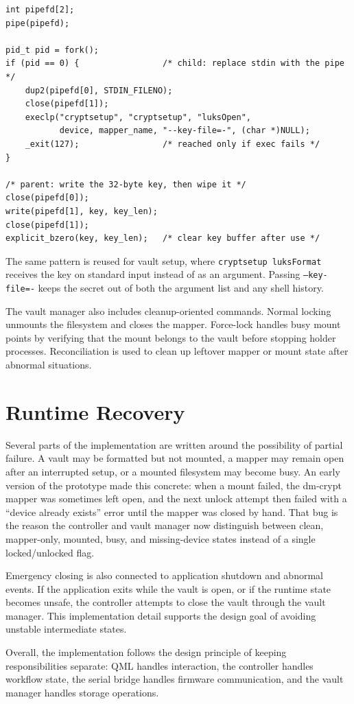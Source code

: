 \begin{lstlisting}[caption={Simplified key handling: the vault key is piped to \texttt{cryptsetup} through standard input and the buffer is cleared after use.},label=lst:key-stdin]
int pipefd[2];
pipe(pipefd);

pid_t pid = fork();
if (pid == 0) {                 /* child: replace stdin with the pipe */
    dup2(pipefd[0], STDIN_FILENO);
    close(pipefd[1]);
    execlp("cryptsetup", "cryptsetup", "luksOpen",
           device, mapper_name, "--key-file=-", (char *)NULL);
    _exit(127);                 /* reached only if exec fails */
}

/* parent: write the 32-byte key, then wipe it */
close(pipefd[0]);
write(pipefd[1], key, key_len);
close(pipefd[1]);
explicit_bzero(key, key_len);   /* clear key buffer after use */
\end{lstlisting}

The same pattern is reused for vault setup, where \texttt{cryptsetup luksFormat} receives the key on standard input instead of as an argument. Passing \texttt{--key-file=-} keeps the secret out of both the argument list and any shell history.

The vault manager also includes cleanup-oriented commands. Normal locking unmounts the filesystem and closes the mapper. Force-lock handles busy mount points by verifying that the mount belongs to the vault before stopping holder processes. Reconciliation is used to clean up leftover mapper or mount state after abnormal situations.

\section{Runtime Recovery}

Several parts of the implementation are written around the possibility of partial failure. A vault may be formatted but not mounted, a mapper may remain open after an interrupted setup, or a mounted filesystem may become busy. An early version of the prototype made this concrete: when a mount failed, the dm-crypt mapper was sometimes left open, and the next unlock attempt then failed with a ``device already exists'' error until the mapper was closed by hand. That bug is the reason the controller and vault manager now distinguish between clean, mapper-only, mounted, busy, and missing-device states instead of a single locked/unlocked flag.

Emergency closing is also connected to application shutdown and abnormal events. If the application exits while the vault is open, or if the runtime state becomes unsafe, the controller attempts to close the vault through the vault manager. This implementation detail supports the design goal of avoiding unstable intermediate states.

Overall, the implementation follows the design principle of keeping responsibilities separate: QML handles interaction, the controller handles workflow state, the serial bridge handles firmware communication, and the vault manager handles storage operations.

